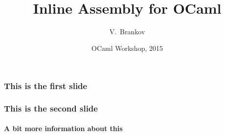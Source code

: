 \documentclass{beamer}
\title[Inline Assembly]
{Inline Assembly for OCaml}
\author[Brankov, Vladimir]{V.~Brankov\inst{1}}
\institute[Jane Street]
{
  \inst{1}
  Jane Street
}
\date[August 2015]
{OCaml Workshop, 2015}
\begin{document}
\begin{frame}
\frametitle{This is the first slide}
\end{frame}
\begin{frame}
\frametitle{This is the second slide}
\framesubtitle{A bit more information about this}
\end{frame}
\end{document}
